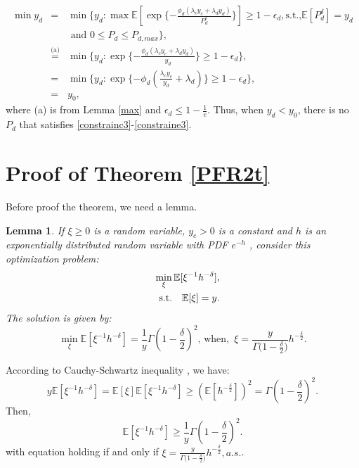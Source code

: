 \documentclass[12pt, draftclsnofoot, journal, letterpaper, onecolumn]{IEEEtran}
\newtheorem{lemma}{Lemma}[section]
\begin{document}
\begin{IEEEproof}
\begin{eqnarray*}
\min y_d&=&\min\big\{y_d:\max\mathbb{E}[\exp\{-\frac{\phi_d(\lambda_cy_c+\lambda_dy_d)}{P_d^\delta}\}]\geq1-\epsilon_d,\mbox{s.t.,}\mathbb{E}[P_d^\delta]=y_d \\&&\mbox{ and } 0\leq P_d\leq P_{d,max} \big\},\\
& \overset{\text{(a)}}{=} & \min\big\{y_d:\exp\{-\frac{\phi_d(\lambda_cy_c+\lambda_dy_d)}{y_d}\}\geq1-\epsilon_d\},\\
&=&\min\big\{y_d:\exp\{-\phi_d(\frac{\lambda_cy_c}{y_d}+\lambda_d)\}\geq1-\epsilon_d\},\\
&=& y_0,
\end{eqnarray*}
where (a) is from Lemma \ref{max} and $\epsilon_d\leq1-\frac{1}{e}$.
Thus, when $y_d<y_0$, there is no $P_d$ that satisfies \eqref{constrainc3}-\eqref{constraine3}.
\end{IEEEproof}

\section{Proof of Theorem \ref{PFR2t}}\label{PFR2tproof}
Before proof the theorem, we need a lemma.
\begin{lemma}\label{min}
If $\xi\geq0$ is a random variable, $y_c>0$ is a constant and $h$ is an exponentially distributed random variable with PDF $e^{-h}$ , consider this optimization problem:
\begin{eqnarray*}
&&\min_{\xi}\mathbb{E}[\xi^{-1}h^{-\delta}],\\
&&{\rm s.t.}~~~\mathbb{E}[\xi]=y.
\end{eqnarray*}
The solution is given by:
\begin{equation*}
\min_\xi\mathbb{E}[\xi^{-1}h^{-\delta}]=\frac{1}{y}\Gamma(1-\frac{\delta}{2})^2 \mbox{, when,}\phantom{a} \xi=\frac{y}{\Gamma{(1-\frac{\delta}{2}})}h^{-\frac{\delta}{2}}.
\end{equation*}
\end{lemma}
\begin{IEEEproof}
According to Cauchy-Schwartz inequality \cite{probability}, we have:
\begin{equation*}
y\mathbb{E}[\xi^{-1}h^{-\delta}]=\mathbb{E}[\xi]\mathbb{E}[\xi^{-1}h^{-\delta}]\geq(\mathbb{E}[h^{-\frac{\delta}{2}}])^2=\Gamma(1-\frac{\delta}{2})^2.
\end{equation*}
Then,
\begin{equation}\label{largerdelta}
\mathbb{E}[\xi^{-1}h^{-\delta}]\geq\frac{1}{y}\Gamma(1-\frac{\delta}{2})^2.
\end{equation}
with equation holding if and only if $\xi=\frac{y}{\Gamma{(1-\frac{\delta}{2}})}h^{-\frac{\delta}{2}}, a.s.$.
\end{IEEEproof}
\end{document}
